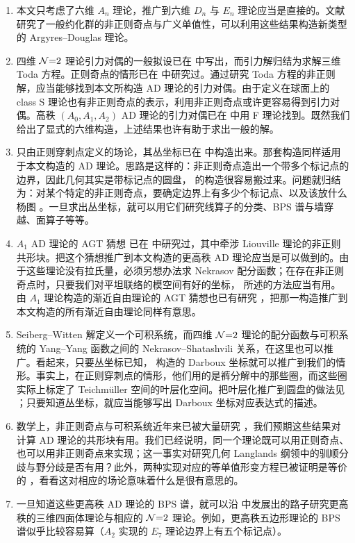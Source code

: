 \begin{enumerate}[label=\textup{\alph*.}]
  \item 本文只考虑了六维 $A_n$ 理论，推广到六维 $D_n$ 与 $E_n$ 理论应当是直接的。文献 \cite{28} 研究了一般约化群的非正则奇点与广义单值性，可以利用这些结果构造新类型的 Argyres--Douglas 理论。
  \item 四维 $\mathcal{N}{=}2$ 理论引力对偶的一般拟设已在 \cite{50} 中写出，而引力解归结为求解三维 Toda 方程。正则奇点的情形已在 \cite{51} 中研究过。通过研究 Toda 方程的非正则解，应当能够找到本文所构造 AD 理论的引力对偶。由于定义在球面上的 class S 理论也有非正则奇点的表示，利用非正则奇点或许更容易得到引力对偶。高秩 $(A_0,A_1,A_2)$ AD 理论的引力对偶已在 \cite{52} 中用 F 理论找到。既然我们给出了显式的六维构造，上述结果也许有助于求出一般的解。
  \item 只由正则穿刺点定义的场论，其丛坐标已在 \cite{53} 中构造出来。那套构造同样适用于本文构造的 AD 理论。思路是这样的：非正则奇点造出一个带多个标记点的边界，因此几何其实是带标记点的圆盘，\cite{53} 的构造很容易搬过来。问题就归结为：对某个特定的非正则奇点，要确定边界上有多少个标记点、以及该放什么杨图 \cite{30}。一旦求出丛坐标，就可以用它们研究线算子的分类、BPS 谱与墙穿越、面算子等等。
  \item $A_1$ AD 理论的 AGT 猜想 \cite{54} 已在 \cite{55,56} 中研究过，其中牵涉 Liouville 理论的非正则共形块。把这个猜想推广到本文构造的更高秩 AD 理论应当是可以做到的。由于这些理论没有拉氏量，必须另想办法求 Nekrasov 配分函数；在存在非正则奇点时，只要我们对平坦联络的模空间有好的坐标，\cite{57} 所述的方法应当有用。由 $A_1$ 理论构造的渐近自由理论的 AGT 猜想也已有研究 \cite{58}，把那一构造推广到本文构造的所有渐近自由理论同样有意思。
  \item Seiberg--Witten 解定义一个可积系统，而四维 $\mathcal{N}{=}2$ 理论的配分函数与可积系统的 Yang--Yang 函数之间的 Nekrasov--Shatashvili 关系，在这里也可以推广。看起来，只要丛坐标已知，\cite{59} 构造的 Darboux 坐标就可以推广到我们的情形。事实上，在正则穿刺点的情形，他们用的是裤分解中的那些圈，而这些圈实际上标定了 Teichmüller 空间的叶层化空间。把叶层化推广到圆盘的做法见 \cite{60}；只要知道丛坐标，就应当能够写出 Darboux 坐标对应表达式的描述。
  \item 数学上，非正则奇点与可积系统近年来已被大量研究 \cite{61}，我们预期这些结果对计算 AD 理论的共形块有用。我们已经说明，同一个理论既可以用正则奇点、也可以用非正则奇点来实现；这一事实对研究几何 Langlands 纲领中的驯顺分歧与野分歧是否有用？此外，两种实现对应的等单值形变方程已被证明是等价的 \cite{62}，看看这对相应的场论意味着什么是很有意思的。
  \item 一旦知道这些更高秩 AD 理论的 BPS 谱，就可以沿 \cite{63} 中发展出的路子研究更高秩的三维四面体理论与相应的 $\mathcal{N}{=}2$ 理论。例如，更高秩五边形理论的 BPS 谱似乎比较容易算（$A_2$ 实现的 $E_7$ 理论边界上有五个标记点）。

\end{enumerate}
